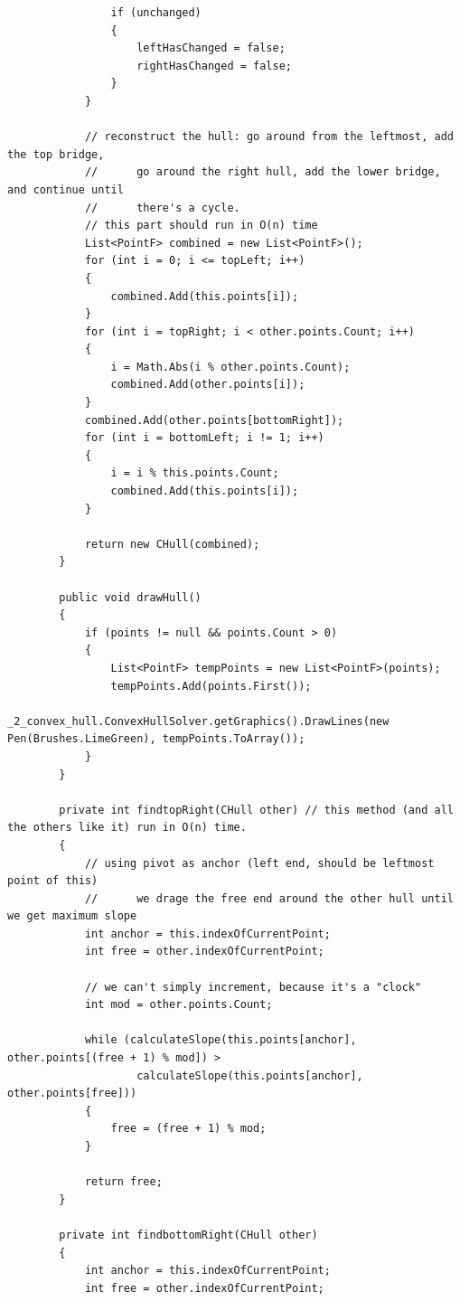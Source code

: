 \documentclass{article}
\begin{document}
\begin{itemize}
\begin{lstlisting}
                if (unchanged)
                {
                    leftHasChanged = false;
                    rightHasChanged = false;
                }
            }

            // reconstruct the hull: go around from the leftmost, add the top bridge, 
            //      go around the right hull, add the lower bridge, and continue until
            //      there's a cycle.
            // this part should run in O(n) time
            List<PointF> combined = new List<PointF>();
            for (int i = 0; i <= topLeft; i++)
            {
                combined.Add(this.points[i]);
            }
            for (int i = topRight; i < other.points.Count; i++)
            {
                i = Math.Abs(i % other.points.Count);
                combined.Add(other.points[i]);
            }
            combined.Add(other.points[bottomRight]);
            for (int i = bottomLeft; i != 1; i++)
            {
                i = i % this.points.Count;
                combined.Add(this.points[i]);
            }

            return new CHull(combined);
        }

        public void drawHull()
        {
            if (points != null && points.Count > 0)
            {
                List<PointF> tempPoints = new List<PointF>(points);
                tempPoints.Add(points.First());
                _2_convex_hull.ConvexHullSolver.getGraphics().DrawLines(new Pen(Brushes.LimeGreen), tempPoints.ToArray());
            }
        }

        private int findtopRight(CHull other) // this method (and all the others like it) run in O(n) time.
        {
            // using pivot as anchor (left end, should be leftmost point of this)
            //      we drage the free end around the other hull until we get maximum slope
            int anchor = this.indexOfCurrentPoint;
            int free = other.indexOfCurrentPoint;

            // we can't simply increment, because it's a "clock"
            int mod = other.points.Count;

            while (calculateSlope(this.points[anchor], other.points[(free + 1) % mod]) > 
                    calculateSlope(this.points[anchor], other.points[free]))
            {
                free = (free + 1) % mod;
            }

            return free;
        }

        private int findbottomRight(CHull other)
        {
            int anchor = this.indexOfCurrentPoint;
            int free = other.indexOfCurrentPoint;


\end{lstlisting}
\end{itemize}
\end{document}
